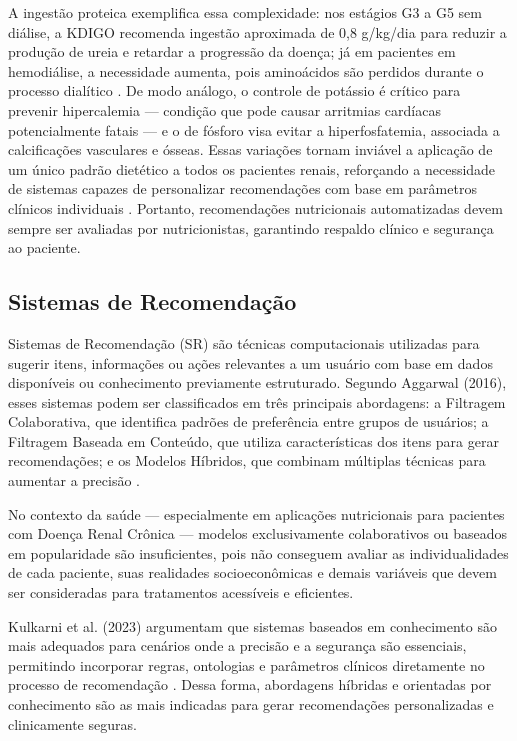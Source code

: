 \documentclass[12pt, a4paper, twocolumn]{article}
\begin{document}
A ingestão proteica exemplifica essa complexidade: nos estágios G3 a G5 sem diálise, a KDIGO recomenda ingestão aproximada de 0,8 g/kg/dia para reduzir a produção de ureia e retardar a progressão da doença; já em pacientes em hemodiálise, a necessidade aumenta, pois aminoácidos são perdidos durante o processo dialítico \cite{vasconcelos2021}. De modo análogo, o controle de potássio é crítico para prevenir hipercalemia --- condição que pode causar arritmias cardíacas potencialmente fatais --- e o de fósforo visa evitar a hiperfosfatemia, associada a calcificações vasculares e ósseas. Essas variações tornam inviável a aplicação de um único padrão dietético a todos os pacientes renais, reforçando a necessidade de sistemas capazes de personalizar recomendações com base em parâmetros clínicos individuais \cite{vasconcelos2021}. Portanto, recomendações nutricionais automatizadas devem sempre ser avaliadas por nutricionistas, garantindo respaldo clínico e segurança ao paciente.

    \subsection{Sistemas de Recomendação}

Sistemas de Recomendação (SR) são técnicas computacionais utilizadas para sugerir itens, informações ou ações relevantes a um usuário com base em dados disponíveis ou conhecimento previamente estruturado. Segundo Aggarwal (2016), esses sistemas podem ser classificados em três principais abordagens: a Filtragem Colaborativa, que identifica padrões de preferência entre grupos de usuários; a Filtragem Baseada em Conteúdo, que utiliza características dos itens para gerar recomendações; e os Modelos Híbridos, que combinam múltiplas técnicas para aumentar a precisão \cite{aggarwal}.

No contexto da saúde --- especialmente em aplicações nutricionais para pacientes com Doença Renal Crônica --- modelos exclusivamente colaborativos ou baseados em popularidade são insuficientes, pois não conseguem avaliar as individualidades de cada paciente, suas realidades socioeconômicas e demais variáveis que devem ser consideradas para tratamentos acessíveis e eficientes.

Kulkarni et al. (2023) argumentam que sistemas baseados em conhecimento são mais adequados para cenários onde a precisão e a segurança são essenciais, permitindo incorporar regras, ontologias e parâmetros clínicos diretamente no processo de recomendação \cite{kulkarni}. Dessa forma, abordagens híbridas e orientadas por conhecimento são as mais indicadas para gerar recomendações personalizadas e clinicamente seguras.
\end{document}
